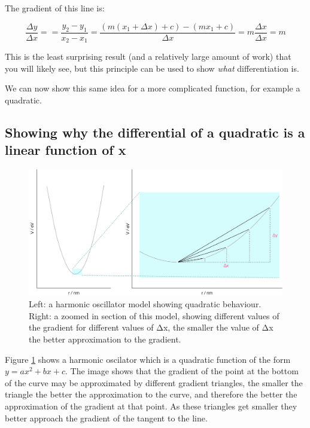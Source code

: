 \documentclass[
]{book}
\begin{document}
The gradient of this line is:

\begin{equation*}
 \frac{\Delta y}{\Delta x} = = \frac{y_2-y_1}{x_2-x_1}=\frac{(m(x_1+ \Delta x) + c) - (mx_1 + c)}{\Delta x} = m\frac{\Delta x}{\Delta x}=m
\end{equation*}

This is the least surprising result (and a relatively large amount of work) that you will likely see, but this principle can be used to show \emph{what} differentiation is.

We can now show this same idea for a more complicated function, for example a quadratic.

\hypertarget{showing-why-the-differential-of-a-quadratic-is-a-linear-function-of-x}{%
\subsection{Showing why the differential of a quadratic is a linear function of x}\label{showing-why-the-differential-of-a-quadratic-is-a-linear-function-of-x}}

\begin{figure}

{\centering \includegraphics[width=0.8\linewidth]{images/quadratic} 

}

\caption{Left: a harmonic oscillator model showing quadratic behaviour. Right: a zoomed in section of this model, showing different values of the gradient for different values of Δx, the smaller the value of Δx the better approximation to the gradient.}\label{fig:quad}
\end{figure}

Figure \ref{fig:quad} shows a harmonic oscilator which is a quadratic function of the form \(y=ax^2+bx+c\). The image shows that the gradient of the point at the bottom of the curve may be approximated by different gradient triangles, the smaller the triangle the better the approximation to the curve, and therefore the better the approximation of the gradient at that point. As these triangles get smaller they better approach the gradient of the tangent to the line.
\end{document}
